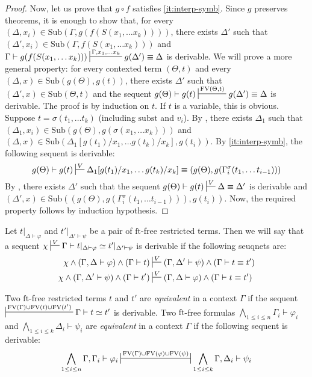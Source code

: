\documentclass[reqno]{amsart}
\theoremstyle{definition}
\theoremstyle{remark}
\newcommand{\fs}[1]{\mathrm{#1}}
\newcommand{\FV}{\fs{FV}}
\newcommand{\subst}{\fs{subst}}
\newcommand{\ft}{\fs{ft}}
\newcommand{\sub}{\fs{Sub}}
\numberwithin{figure}{section}
\begin{document}
\begin{proof}
Now, let us prove that $g \circ f$ satisfies \eqref{it:interp-symb}.
Since $g$ preserves theorems, it is enough to show that, for every $(\Delta,x_i) \in \sub(\Gamma, g(f(S(x_1, \ldots x_k))))$, there exists $\Delta'$ such that $(\Delta',x_i) \in \sub(\Gamma, f(S(x_1, \ldots x_k)))$ and $\Gamma \vdash g(f(S(x_1, \ldots x_k))) \sststile{}{\Gamma, x_1, \ldots x_k} g(\Delta') \equiv \Delta$ is derivable.
We will prove a more general property: for every contexted term $(\Theta,t)$ and every $(\Delta,x) \in \sub(g(\Theta), g(t))$, there exists $\Delta'$ such that $(\Delta',x) \in \sub(\Theta, t)$ and the sequent $g(\Theta) \vdash g(t) \sststile{}{\FV(\Theta,t)} g(\Delta') \equiv \Delta$ is derivable.
The proof is by induction on $t$.
If $t$ is a variable, this is obvious.
Suppose $t = \sigma(t_1, \ldots t_k)$ (including $\subst$ and $v_i$).
By , there exists $\Delta_1$ such that $(\Delta_1,x_i) \in \sub(g(\Theta), g(\sigma(x_1, \ldots x_k)))$ and $(\Delta,x) \in \sub(\Delta_1[g(t_1)/x_1, \ldots g(t_k)/x_k], g(t_i))$.
By \eqref{it:interp-symb}, the following sequent is derivable:
\[ g(\Theta) \vdash g(t) \sststile{}{V} \Delta_1[g(t_1)/x_1, \ldots g(t_k)/x_k] \equiv (g(\Theta), g(\Gamma^\sigma_i(t_1, \ldots t_{i-1}))) \]
By , there exists $\Delta'$ such that the sequent $g(\Theta) \vdash g(t) \sststile{}{V} \Delta \equiv \Delta'$ is derivable and $(\Delta',x) \in \sub((g(\Theta), g(\Gamma^\sigma_i(t_1, \ldots t_{i-1}))), g(t_i))$.
Now, the required property follows by induction hypothesis.
\end{proof}

Let $t|_{\Delta \vdash \varphi}$ and $t'|_{\Delta' \vdash \psi}$ be a pair of $\ft$-free restricted terms.
Then we will say that a sequent $\chi \sststile{}{V} \Gamma \vdash t|_{\Delta \vdash \varphi} \simeq t'|_{\Delta' \vdash \psi}$ is derivable if the following seuqnets are:
\begin{align*}
\chi \land (\Gamma, \Delta \vdash \varphi) \land (\Gamma \vdash t) & \sststile{}{V} (\Gamma, \Delta' \vdash \psi) \land (\Gamma \vdash t \equiv t') \\
\chi \land (\Gamma, \Delta' \vdash \psi) \land (\Gamma \vdash t') & \sststile{}{V} (\Gamma, \Delta \vdash \varphi) \land (\Gamma \vdash t \equiv t')
\end{align*}

Two $\ft$-free restricted terms $t$ and $t'$ are \emph{equivalent} in a context $\Gamma$ if the sequent $\sststile{}{\FV(\Gamma) \cup \FV(t) \cup \FV(t')} \Gamma \vdash t \simeq t'$ is derivable.
Two $\ft$-free formulas $\bigwedge_{1 \leq i \leq n} \Gamma_i \vdash \varphi_i$ and $\bigwedge_{1 \leq i \leq k} \Delta_i \vdash \psi_i$ are \emph{equivalent} in a context $\Gamma$
if the following sequent is derivable:
\[ \bigwedge_{1 \leq i \leq n} \Gamma, \Gamma_i \vdash \varphi_i \ssststile{}{\FV(\Gamma) \cup \FV(\varphi) \cup \FV(\psi)} \bigwedge_{1 \leq i \leq k} \Gamma, \Delta_i \vdash \psi_i \]
\end{document}
